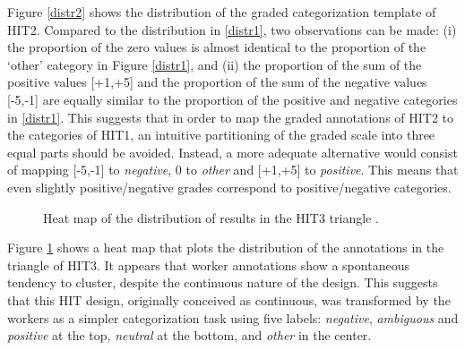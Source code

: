 \documentclass[11pt, a4paper,onecolumn]{article}
\begin{document}
Figure \ref{distr2} shows the distribution of the graded categorization template of HIT2. Compared to the distribution in \ref{distr1}, two observations can be made: (i) the proportion of the zero values is almost identical to the proportion of the `other' category in Figure \ref{distr1}, and (ii) the proportion of the sum of the positive values [+1,+5] and the proportion of the sum of the negative values [-5,-1] are equally similar to the proportion of the positive and negative categories in \ref{distr1}. This suggests that in order to map the graded annotations of HIT2 to the categories of HIT1, an intuitive partitioning of the graded scale into three equal parts should be avoided. Instead, a more adequate alternative would consist of mapping [-5,-1] to \textit{negative}, 0 to \textit{other} and [+1,+5] to \textit{positive}. This means that even slightly positive/negative grades correspond to positive/negative categories.



\begin{figure}[h]
  \begin{center}
	\caption{Heat map of the distribution of results in the HIT3 triangle .}
	\label{distr3}
  \end{center}
\end{figure}

Figure \ref{distr3} shows a heat map that plots the distribution of the annotations in the triangle of HIT3. It appears that worker annotations show a spontaneous tendency to cluster, despite the continuous nature of the design. This suggests that this HIT design, originally conceived as continuous, was transformed by the workers as a simpler categorization task using five labels: \textit{negative}, \textit{ambiguous} and \textit{positive} at the top, \textit{neutral} at the bottom, and \textit{other} in the center.
\end{document}
